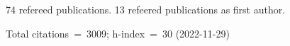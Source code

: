 74 refereed publications. 13 refeered publications as first author.

Total citations~=~3009; h-index~=~30 (2022-11-29)